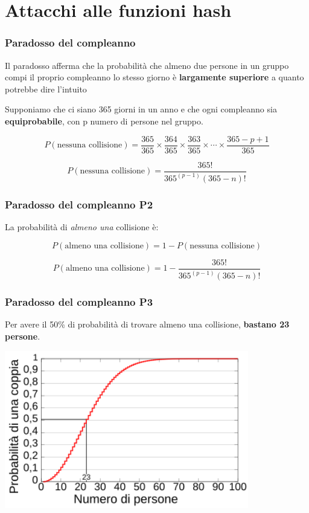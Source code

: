 \section{Attacchi alle funzioni hash}

\begin{frame}
\frametitle{Paradosso del compleanno}

Il paradosso afferma che la probabilità che almeno due persone in un gruppo compi il proprio compleanno lo stesso giorno è \textbf{largamente superiore} a quanto potrebbe dire l'intuito

Supponiamo che ci siano 365 giorni in un anno e che ogni compleanno sia \textbf{equiprobabile}, con p numero di persone nel gruppo.

\[
P(\text{nessuna collisione}) = \frac{365}{365} \times \frac{364}{365} \times \frac{363}{365} \times \cdots \times \frac{365 - p + 1}{365}
\]

\[
P(\text{nessuna collisione}) = \frac{365!}{365^(p-1) (365 - n)!}
\]

\end{frame}

\begin{frame}
\frametitle{Paradosso del compleanno P2}

La probabilità di \textit{almeno una} collisione è:

\[
P(\text{almeno una collisione}) = 1 - P(\text{nessuna collisione})
\]

\[
P(\text{almeno una collisione}) = 1 - \frac{365!}{365^(p-1) (365 - n)!}
\]

\end{frame}


\begin{frame}
\frametitle{Paradosso del compleanno P3}

Per avere il 50\% di probabilità di trovare almeno una collisione, \textbf{bastano 23 persone}.

\begin{center}
    \includegraphics[width=0.8\textwidth]{img/2-img/Birthday_Paradox_IT.png}
\end{center}

\end{frame}

